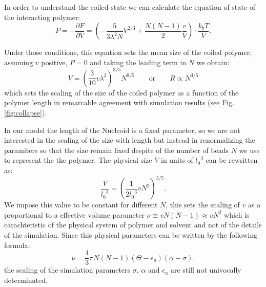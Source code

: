 \documentclass[12pt,a4paper,notitlepage]{article}
\begin{document}
In order to understand the coiled state we can calculate the equation
of state of the interacting polymer:
\begin{equation}
  P = - \frac{\partial F}{\partial V} = \left( - \frac{5}
      {3 \lambda^2 N} V^{2/3} + \frac{N(N-1)}{2} 
      \frac{v}{V} \right) \cdot \frac{k_b T}{V}.
\end{equation}

Under those conditions, this equation sets the mean size of the coiled
polymer, assuming $v$ positive, $P = 0$ and taking the leading term in
$N$ we obtain:
\begin{equation}
  V = \left( \frac{3}{10} v \lambda^2 \right) ^{3/5} N^{9/5} \qquad 
  \mathrm{or} \qquad R \propto N^{3/5}
\label{eq:volcoil}
\end{equation}
which sets the scaling of the size of the coiled polymer as a function
of the polymer length in remarcable agreement with simulation
results (see Fig. \ref{fig:collapse}).

In our model the length of the Nucleoid is a fixed parameter, so we
are not interested in the scaling of the size with length but instead
in renormalizing the paramiters so that the size remain fixed despite
of the number of beads $N$ we use to represent the the polymer. The
physical size $V$ in units of ${l_0}^3$ can be rewritten as:
\begin{equation}
  \frac{V}{{l_0}^3} = \left( \frac{1}{2{l_0}^3} v N^2 \right)^{3/5}.
\end{equation}
We impose this value to be constant for different $N$, this sets the
scaling of $v$ as a proportional to a effective volume parameter
$\nu \equiv v N(N-1) \approx v N^2$ which is carachteristic of the
physical system of polymer and solvent and not of the details of the
simulation. Since this physical parameters can be written by the
following formula:
\begin{equation}
  \nu = \frac{4}{3} \pi N(N-1) (\Theta - \epsilon_u)
  (\alpha - \sigma).
\label{eq:nuvolume}
\end{equation}
the scaling of the simulation parameters $\sigma$, $\alpha$
and $\epsilon_u$ are still not univocally determinated.
\end{document}
